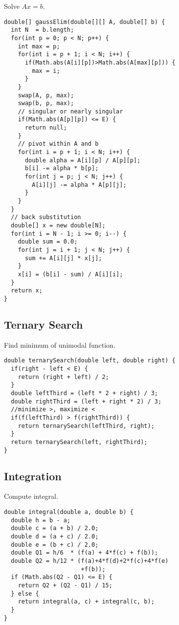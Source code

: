 Solve $Ax = b$. \\

\begin{lstlisting}
double[] gaussElim(double[][] A, double[] b) {
  int N  = b.length;
  for(int p = 0; p < N; p++) {
    int max = p;
    for(int i = p + 1; i < N; i++) {
      if(Math.abs(A[i][p])>Math.abs(A[max][p])) {
        max = i;
      } 
    }
    swap(A, p, max);
    swap(b, p, max);
    // singular or nearly singular
    if(Math.abs(A[p][p]) <= E) {
      return null;
    }
    // pivot within A and b
    for(int i = p + 1; i < N; i++) {
      double alpha = A[i][p] / A[p][p];
      b[i] -= alpha * b[p];
      for(int j = p; j < N; j++) {
        A[i][j] -= alpha * A[p][j];
      }
    }
  }
  // back substitution
  double[] x = new double[N];
  for(int i = N - 1; i >= 0; i--) {
    double sum = 0.0;
    for(int j = i + 1; j < N; j++) {
      sum += A[i][j] * x[j];
    }
    x[i] = (b[i] - sum) / A[i][i];
  }
  return x;
}
\end{lstlisting}

\subsection{Ternary Search}

Find minimum of unimodal function.

\begin{lstlisting}
double ternarySearch(double left, double right) {
  if(right - left < E) {
    return (right + left) / 2;
  }
  double leftThird = (left * 2 + right) / 3;
  double rightThird = (left + right * 2) / 3;
  //minimize >, maximize <
  if(f(leftThird) > f(rightThird)) { 
    return ternarySearch(leftThird, right);
  }			   
  return ternarySearch(left, rightThird);
}
\end{lstlisting}

\subsection{Integration}

Compute integral.

\begin{lstlisting}
double integral(double a, double b) {
  double h = b - a;
  double c = (a + b) / 2.0;
  double d = (a + c) / 2.0;
  double e = (b + c) / 2.0;
  double Q1 = h/6  * (f(a) + 4*f(c) + f(b));
  double Q2 = h/12 * (f(a)+4*f(d)+2*f(c)+4*f(e)  
                      +f(b));
  if (Math.abs(Q2 - Q1) <= E) {
    return Q2 + (Q2 - Q1) / 15;
  } else {        	
    return integral(a, c) + integral(c, b);
  }
}
\end{lstlisting}
